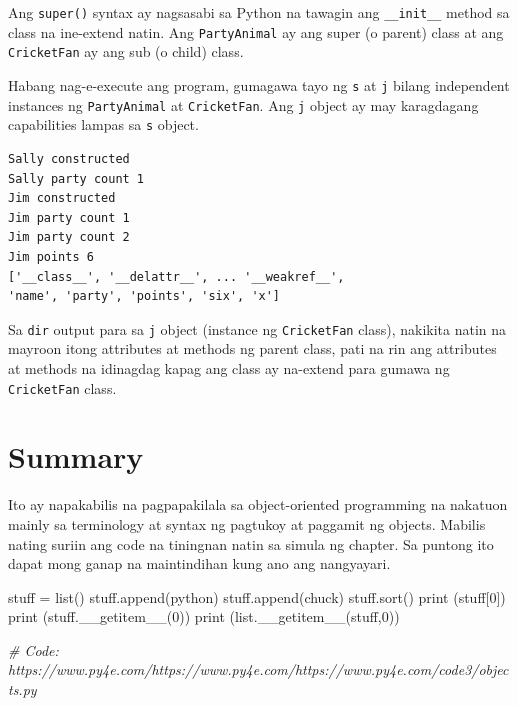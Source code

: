 \documentclass[10pt,]{book}
\newenvironment{Shaded}{}{}
\newcommand{\BuiltInTok}[1]{\textcolor[rgb]{0.00,0.50,0.00}{#1}}
\newcommand{\CommentTok}[1]{\textcolor[rgb]{0.38,0.63,0.69}{\textit{#1}}}
\newcommand{\DecValTok}[1]{\textcolor[rgb]{0.25,0.63,0.44}{#1}}
\newcommand{\FunctionTok}[1]{\textcolor[rgb]{0.02,0.16,0.49}{#1}}
\newcommand{\NormalTok}[1]{#1}
\newcommand{\OperatorTok}[1]{\textcolor[rgb]{0.40,0.40,0.40}{#1}}
\newcommand{\StringTok}[1]{\textcolor[rgb]{0.25,0.44,0.63}{#1}}
\begin{document}
 Ang \texttt{super()} syntax ay nagsasabi sa Python
na tawagin ang \texttt{\_\_init\_\_} method sa class na ine-extend
natin. Ang \texttt{PartyAnimal} ay ang super (o parent) class at ang
\texttt{CricketFan} ay ang sub (o child) class.

Habang nag-e-execute ang program, gumagawa tayo ng \texttt{s} at
\texttt{j} bilang independent instances ng \texttt{PartyAnimal} at
\texttt{CricketFan}. Ang \texttt{j} object ay may karagdagang
capabilities lampas sa \texttt{s} object.

{\small
\begin{verbatim}
Sally constructed
Sally party count 1
Jim constructed
Jim party count 1
Jim party count 2
Jim points 6
['__class__', '__delattr__', ... '__weakref__',
'name', 'party', 'points', 'six', 'x']
\end{verbatim}
}

Sa \texttt{dir} output para sa \texttt{j} object (instance ng
\texttt{CricketFan} class), nakikita natin na mayroon itong attributes
at methods ng parent class, pati na rin ang attributes at methods na
idinagdag kapag ang class ay na-extend para gumawa ng
\texttt{CricketFan} class.

\section{Summary}\label{summary-1}

Ito ay napakabilis na pagpapakilala sa object-oriented programming na
nakatuon mainly sa terminology at syntax ng pagtukoy at paggamit ng
objects. Mabilis nating suriin ang code na tiningnan natin sa simula ng
chapter. Sa puntong ito dapat mong ganap na maintindihan kung ano ang
nangyayari.

\begin{Shaded}
\begin{Highlighting}[]
\NormalTok{stuff }\OperatorTok{=} \BuiltInTok{list}\NormalTok{()}
\NormalTok{stuff.append(}\StringTok{\textquotesingle{}python\textquotesingle{}}\NormalTok{)}
\NormalTok{stuff.append(}\StringTok{\textquotesingle{}chuck\textquotesingle{}}\NormalTok{)}
\NormalTok{stuff.sort()}
\BuiltInTok{print}\NormalTok{ (stuff[}\DecValTok{0}\NormalTok{])}
\BuiltInTok{print}\NormalTok{ (stuff.}\FunctionTok{\_\_getitem\_\_}\NormalTok{(}\DecValTok{0}\NormalTok{))}
\BuiltInTok{print}\NormalTok{ (}\BuiltInTok{list}\NormalTok{.}\FunctionTok{\_\_getitem\_\_}\NormalTok{(stuff,}\DecValTok{0}\NormalTok{))}

\CommentTok{\# Code: https://www.py4e.com/https://www.py4e.com/https://www.py4e.com/code3/objects.py}
\end{Highlighting}
\end{Shaded}
\end{document}
